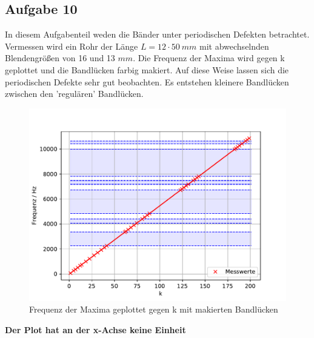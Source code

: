 \subsection{Aufgabe 10}
In diesem Aufgabenteil weden die Bänder unter periodischen Defekten betrachtet.
Vermessen wird ein Rohr der Länge $L=12 \cdot \SI{50}{mm}$ mit abwechselnden Blendengrößen von 16 und 13 $\si{mm}$.
Die Frequenz der Maxima wird gegen k geplottet und die Bandlücken farbig makiert.
Auf diese Weise lassen sich die periodischen Defekte sehr gut beobachten.
Es entstehen kleinere Bandlücken zwischen den 'regulären' Bandlücken.
\begin{figure}[h!]
  \centering
  \includegraphics[width=1\textwidth]{A101.pdf}
  \caption{Frequenz der Maxima geplottet gegen k mit makierten Bandlücken}
  \label{fig.Aufgabe101}
\end{figure}
  \FloatBarrier
  \textbf{\huge{Der Plot hat an der x-Achse keine Einheit}}


